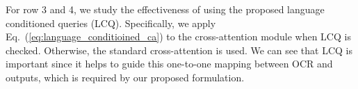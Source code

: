 For row 3 and 4, we study the effectiveness of using the proposed language conditioned queries (LCQ). Specifically, we apply Eq.~(\ref{eq:language_conditioined_ca}) to the cross-attention module when LCQ is checked. Otherwise, the standard cross-attention is used. We can see that LCQ is important since it helps to guide this one-to-one mapping between OCR and outputs, which is required by our proposed formulation. 